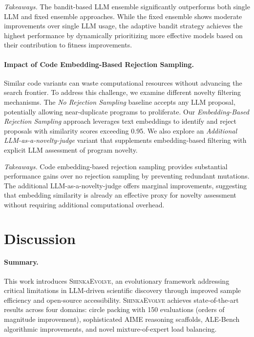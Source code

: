 \documentclass[11pt, a4paper]{include/gdm_format}
\newcommand{\ouralgo}{\textsc{ShinkaEvolve}\xspace}
\begin{document}
\textit{Takeaways.} The bandit-based LLM ensemble significantly outperforms both single LLM and fixed ensemble approaches. While the fixed ensemble shows moderate improvements over single LLM usage, the adaptive bandit strategy achieves the highest performance by dynamically prioritizing more effective models based on their contribution to fitness improvements.

\paragraph{Impact of Code Embedding-Based Rejection Sampling.}
Similar code variants can waste computational resources without advancing the search frontier. To address this challenge, we examine different novelty filtering mechanisms. The \textit{No Rejection Sampling} baseline accepts any LLM proposal, potentially allowing near-duplicate programs to proliferate. Our \textit{Embedding-Based Rejection Sampling} approach leverages text embeddings to identify and reject proposals with similarity scores exceeding 0.95. We also explore an \textit{Additional LLM-as-a-novelty-judge} variant that supplements embedding-based filtering with explicit LLM assessment of program novelty.

\textit{Takeaways.} Code embedding-based rejection sampling provides substantial performance gains over no rejection sampling by preventing redundant mutations. The additional LLM-as-a-novelty-judge offers marginal improvements, suggesting that embedding similarity is already an effective proxy for novelty assessment without requiring additional computational overhead.
















\section{Discussion}


\paragraph{Summary.}
This work introduces \ouralgo, an evolutionary framework addressing critical limitations in LLM-driven scientific discovery through improved sample efficiency and open-source accessibility.
\ouralgo achieves state-of-the-art results across four domains: circle packing with 150 evaluations (orders of magnitude improvement), sophisticated AIME reasoning scaffolds, ALE-Bench algorithmic improvements, and novel mixture-of-expert load balancing.
\end{document}
